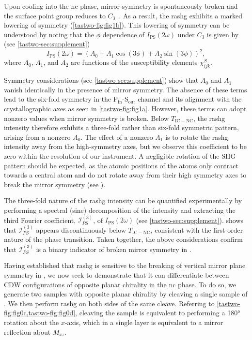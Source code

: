 Upon cooling into the \gls{nc} phase, mirror symmetry is spontaneously broken and the surface point group reduces to $C_3$~\citep{spijkerman_x-ray_1997}.
As a result, the \gls{rashg} exhibits a marked lowering of symmetry (\cref{tastwo-fig:fig1b}).
This lowering of symmetry can be understood by noting that the $\phi$ dependence of $I_\mathrm{PS}(2\omega)$ under $C_3$ is given by (see \cref{tastwo-sec:supplement})
\begin{equation}
\label{tastwo-eq:intensityequation}
I_\mathrm{PS}(2\omega) = (A_0 + A_1\cos{(3\phi)} + A_2\sin{(3\phi)})^2,
\end{equation}
where $A_0$, $A_1$, and $A_2$ are functions of the susceptibility elements $\chi^S_{ijk}$.

Symmetry considerations (see \cref{tastwo-sec:supplement}) show that $A_0$ and $A_1$ vanish identically in the presence of mirror symmetry. The absence of these terms lead to the six-fold symmetry in the P$_{\mathrm{in}}$-S$_{\mathrm{out}}$ channel and its alignment with the crystallographic axes as seen in \cref{tastwo-fig:fig1a}.
However, these terms can adopt nonzero values when mirror symmetry is broken.
Below $T_{\mathrm{IC-NC}}$, the \gls{rashg} intensity therefore exhibits a three-fold rather than six-fold symmetric pattern, arising from a nonzero $A_0$. 
The effect of a nonzero $A_1$ is to rotate the \gls{rashg} intensity away from the high-symmetry axes, but we observe this coefficient to be zero within the resolution of our instrument.
A negligible rotation of the SHG pattern should be expected, as the atomic positions of the  atoms only contract towards a central  atom and do not rotate away from their high symmetry axes to break the mirror symmetry (see ).

The three-fold nature of the \gls{rashg} intensity can be quantified experimentally by performing a spectral (sine) decomposition of the intensity and extracting the third Fourier coefficient, $\mathscr{I}_{PS}^{(3)}$, of $I_\mathrm{PS}(2\omega)$ (see \cref{tastwo-sec:supplement}).
 shows that $\mathscr{I}_{PS}^{(3)}$ appears discontinuously below $T_{\mathrm{IC-NC}}$, consistent with the first-order nature of the phase transition.
Taken together, the above considerations confirm that $\mathscr{I}_{PS}^{(3)}$ is a binary indicator of broken mirror symmetry in \tastwo.

Having established that \gls{rashg} is sensitive to the breaking of vertical mirror plane symmetry in \tastwo, we now seek to demonstrate that it can differentiate between CDW configurations of opposite planar chirality in the \gls{nc} phase.
To do so, we generate two samples with opposite planar chirality by cleaving a single sample of \tastwo.
We then perform \gls{rashg} on both sides of the same cleave.
Referring to \cref{tastwo-fig:fig0c,tastwo-fig:fig0d}, cleaving the sample is equivalent to performing a \ang{180} rotation about the $x$-axis, which in a single layer is equivalent to a mirror reflection about $M_{xz}$.

